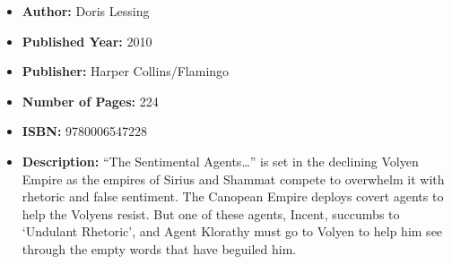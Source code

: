 \documentclass{tufte-handout}
\begin{document}
\begin{itemize}
    \item[] \textbf{Author:} Doris Lessing
    \item[] \textbf{Published Year:} 2010  
    \item[] \textbf{Publisher:} Harper Collins/Flamingo 
    \item[] \textbf{Number of Pages:} 224      
    \item[] \textbf{ISBN:} 9780006547228
    \item[] \textbf{Description:} ``The Sentimental Agents\ldots'' is set in the declining Volyen Empire as the empires of Sirius and Shammat compete to overwhelm it with rhetoric and false sentiment. The Canopean Empire deploys covert agents to help the Volyens resist. But one of these agents, Incent, succumbs to ‘Undulant Rhetoric’, and Agent Klorathy must go to Volyen to help him see through the empty words that have beguiled him.
\end{itemize}
\end{document}
